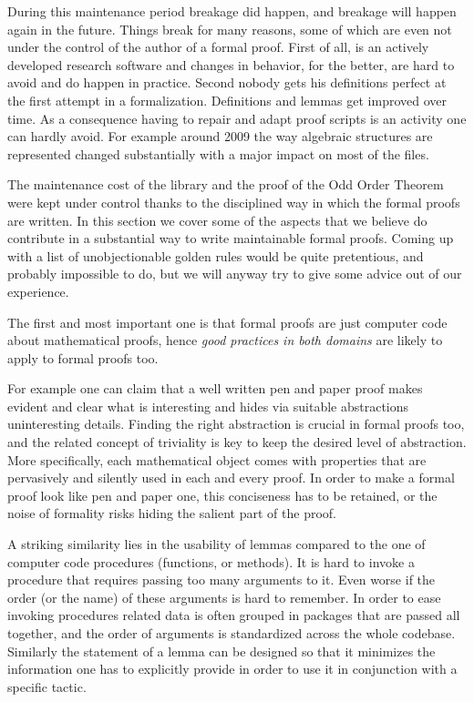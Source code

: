 During this maintenance period breakage did happen, and breakage will happen
again in the future. Things break for many reasons, some of which are even not
under the control of the author of a formal proof. First of all, \Coq{} is an
actively developed research software and changes in behavior, for the better,
are hard to avoid and do happen in practice. Second nobody gets his definitions
perfect at the first attempt in a formalization. Definitions and lemmas get
improved over time.  As a consequence having to repair and adapt proof scripts
is an activity one can hardly avoid.  For example around 2009 the way algebraic
structures are represented changed substantially with a major impact on most
of the files.

The maintenance cost of the  \mcbMC{} library and the proof of the
Odd Order Theorem were kept under control thanks to the disciplined
way in which the formal proofs are written.
In this section we cover some of the aspects that we believe do
contribute in a substantial way to write maintainable formal proofs.
Coming up with a list of unobjectionable golden rules would be quite pretentious,
and probably impossible to do, but we will anyway try to give some
advice out of our experience.

The first and most important one is that formal proofs are just computer code
about mathematical proofs, hence \emph{good practices in both domains}
are likely to apply to formal proofs too.

For example one can claim that a well written pen and paper proof makes evident
and clear what is interesting and hides via suitable abstractions uninteresting
details. Finding the right abstraction is crucial in formal proofs too, and the
related concept of triviality is key to keep the desired level of abstraction.
More specifically, each mathematical object comes with properties that are
pervasively and silently used in each and every proof. In order to make a
formal proof look like pen and paper one, this conciseness has to be retained,
or the noise of formality risks hiding the salient part of the proof.

A striking similarity lies in the usability of lemmas
compared to the one of computer code procedures (functions, or methods).
It is hard to invoke a procedure that requires
passing too many arguments to it. Even worse if the order (or the name)
of these arguments is hard to remember.
In order to ease invoking procedures related data is often
grouped in packages that are passed all together,
and the order of arguments is standardized across the whole codebase.
Similarly the statement of a lemma can be designed so that it
minimizes the information one has to explicitly provide
in order to use it in conjunction with a specific tactic.


